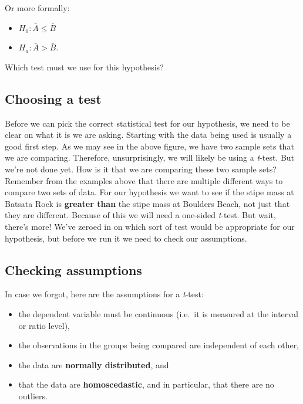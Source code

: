 \documentclass[english,10pt,a4paper,oneside]{book}
\providecommand{\tightlist}{%
  \setlength{\itemsep}{0pt}\setlength{\parskip}{0pt}}
\theoremstyle{definition}
\theoremstyle{definition}
\theoremstyle{definition}
\theoremstyle{remark}
\begin{document}
Or more formally:

\begin{itemize}
\tightlist
\item
  \(H_{0}: \bar{A} \leq \bar{B}\)
\item
  \(H_{a}: \bar{A} > \bar{B}\).
\end{itemize}

Which test must we use for this hypothesis?

\subsection{Choosing a test}\label{choosing-a-test}

Before we can pick the correct statistical test for our hypothesis, we
need to be clear on what it is we are asking. Starting with the data
being used is usually a good first step. As we may see in the above
figure, we have two sample sets that we are comparing. Therefore,
unsurprisingly, we will likely be using a \emph{t}-test. But we're not
done yet. How is it that we are comparing these two sample sets?
Remember from the examples above that there are multiple different ways
to compare two sets of data. For our hypothesis we want to see if the
stipe mass at Batsata Rock is \textbf{greater than} the stipe mass at
Boulders Beach, not just that they are different. Because of this we
will need a one-sided \emph{t}-test. But wait, there's more! We've
zeroed in on which sort of test would be appropriate for our hypothesis,
but before we run it we need to check our assumptions.

\subsection{Checking assumptions}\label{checking-assumptions}

In case we forgot, here are the assumptions for a \emph{t}-test:

\begin{itemize}
\tightlist
\item
  the dependent variable must be continuous (i.e.~it is measured at the
  interval or ratio level),
\item
  the observations in the groups being compared are independent of each
  other,
\item
  the data are \textbf{normally distributed}, and
\item
  that the data are \textbf{homoscedastic}, and in particular, that
  there are no outliers.
\end{itemize}
\end{document}
